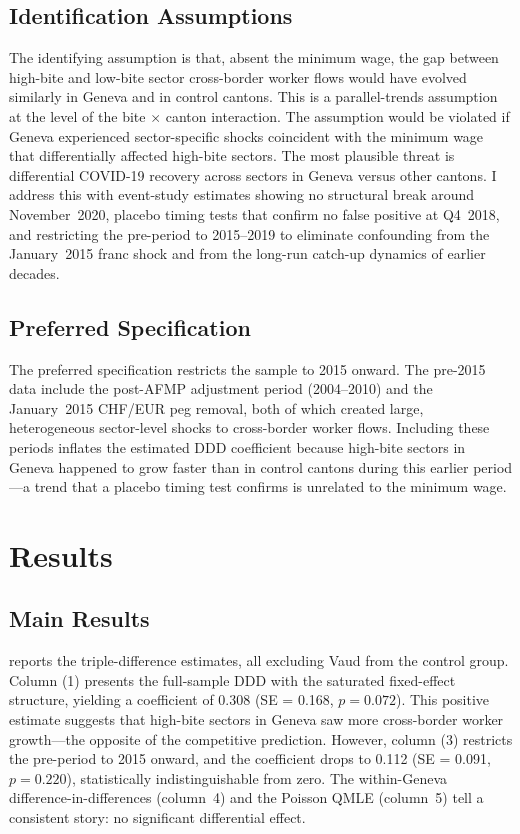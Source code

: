 \documentclass[12pt]{article}
\begin{document}
\subsection{Identification Assumptions}

The identifying assumption is that, absent the minimum wage, the gap between high-bite and low-bite sector cross-border worker flows would have evolved similarly in Geneva and in control cantons. This is a parallel-trends assumption at the level of the bite $\times$ canton interaction. The assumption would be violated if Geneva experienced sector-specific shocks coincident with the minimum wage that differentially affected high-bite sectors. The most plausible threat is differential COVID-19 recovery across sectors in Geneva versus other cantons. I address this with event-study estimates showing no structural break around November~2020, placebo timing tests that confirm no false positive at Q4~2018, and restricting the pre-period to 2015--2019 to eliminate confounding from the January~2015 franc shock and from the long-run catch-up dynamics of earlier decades.

\subsection{Preferred Specification}

The preferred specification restricts the sample to 2015 onward. The pre-2015 data include the post-AFMP adjustment period (2004--2010) and the January~2015 CHF/EUR peg removal, both of which created large, heterogeneous sector-level shocks to cross-border worker flows. Including these periods inflates the estimated DDD coefficient because high-bite sectors in Geneva happened to grow faster than in control cantons during this earlier period---a trend that a placebo timing test confirms is unrelated to the minimum wage.


\section{Results}
\label{sec:results}

\subsection{Main Results}

 reports the triple-difference estimates, all excluding Vaud from the control group. Column (1) presents the full-sample DDD with the saturated fixed-effect structure, yielding a coefficient of 0.308 (SE = 0.168, $p = 0.072$). This positive estimate suggests that high-bite sectors in Geneva saw more cross-border worker growth---the opposite of the competitive prediction. However, column (3) restricts the pre-period to 2015 onward, and the coefficient drops to 0.112 (SE = 0.091, $p = 0.220$), statistically indistinguishable from zero. The within-Geneva difference-in-differences (column~4) and the Poisson QMLE (column~5) tell a consistent story: no significant differential effect.
\end{document}
